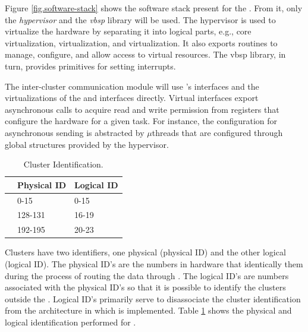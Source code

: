 	Figure \ref{fig.software-stack} shows the software stack present for the \mppa.
	From it, only the \textit{hypervisor} and the \textit{vbsp} library will be used.
	The hypervisor is used to virtualize the hardware by separating it into logical
	parts, e.g., core virtualization, \cnoc virtualization, and \dnoc virtualization.
	It also exports routines to manage, configure, and allow access to virtual resources.
	The vbsp library, in turn, provides primitives for setting interrupts.

	The inter-cluster communication module will use \hal's interfaces and the
	virtualizations of the \cnoc and \dnoc interfaces directly.
	Virtual \noc interfaces export asynchronous calls to acquire read and write
	permission from registers that configure the hardware for a given task.
	For instance, the \dma configuration for asynchronous sending is abstracted by
	$\mu$threads that are configured through global structures provided by the hypervisor.

	\begin{table}[t]
		\caption{Cluster Identification.}

		\begin{tabular}{|l|l|l|}
			\hline
						         & \textbf{Physical ID} & \textbf{Logical ID} \\ \hline
			\textbf{\ccluster}   & 0-15                 & 0-15                \\ \hline
			\textbf{\iocluster0} & 128-131              & 16-19               \\ \hline
			\textbf{\iocluster1} & 192-195              & 20-23               \\ \hline
		\end{tabular}

		\label{tab.cluster-id}
	\end{table}

	Clusters have two identifiers, one physical (physical ID) and the
	other logical (logical ID).
	The physical ID's are the numbers in hardware that identically them
	during the process of routing the data through \noc.
	The logical ID's are numbers associated with the physical ID's so
	that it is possible to identify the clusters outside the \hal.
	Logical ID's primarily serve to disassociate the cluster
	identification from the architecture in which \hal is implemented.
	Table \ref{tab.cluster-id} shows the physical and logical
	identification performed for \mppa.

